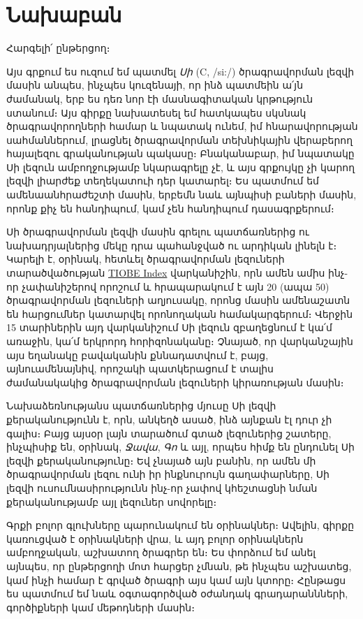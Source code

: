 \chapter*{Նախաբան}

Հարգելի՛ ընթերցող։

Այս գրքում ես ուզում եմ պատմել \emph{Սի} (C, /si:/) ծրագրավորման լեզվի մասին անպես, ինչպես կուզենայի, որ ինձ պատմեին ա՛յն ժամանակ, երբ ես դեռ նոր էի մասնագիտական կրթություն ստանում։ Այս գիրքը նախատեսել եմ հատկապես սկսնակ ծրագրավորողների համար և նպատակ ունեմ, իմ հնարավորության սահմաններում, լրացնել ծրագրավորման տեխնիկային վերաբերող հայալեզու գրականության պակասը։ Բնականաբար, իմ նպատակը Սի լեզուն ամբողջութ\-յամբ նկարագրելը չէ, և այս գրքույկը չի կարող լեզվի լիարժեք տեղեկատուի դեր կատարել։ Ես պատմում եմ ամենաանհրաժեշտի մասին, երբեմն նաև այնպիսի բաների մասին, որոնք քիչ են հանդիպում, կամ չեն հանդիպում դասագրքերում։

Սի ծրագրավորման լեզվի մասին գրելու պատճառներից ու նախադրյալներից մեկը դրա պահանջված ու արդիկան լինելն է։ Կարելի է, օրինակ, հետևել ծրագրավորման լեզուների տարածվածության \href{http://www.tiobe.com/index.php/content/paperinfo/tpci/index.html}{TIOBE Index} վարկանիշին, որն ամեն ամիս ինչ-որ չափանիշերով որոշում և հրապարակում է այն 20 (ապա 50) ծրագրավորման լեզուների աղյուսակը, որոնց մասին ամենաշատն են հարցում\-ներ կատարվել որոնողական համակարգերում։ Վերջին 15 տարիներին այդ վարկանիշում Սի լեզուն զբաղեցնում է կա՛մ առաջին, կա՛մ երկրորդ հորիզոնա\-կանը։ Չնայած, որ վարկանշային այս եղանակը բավականին քննադատվում է, բայց, այնուամենայնիվ, որոշակի պատկերացում է տալիս ժամանակակից ծրագրավորման լեզուների կիրառության մասին։

Նախաձեռնությանս պատճառներից մյուսը Սի լեզվի քերականությունն է, որն, անկեղծ ասած, ինձ այնքան էլ դուր չի գալիս։ Բայց այսօր լայն տարածում գտած լեզուներից շատերը, ինչպիսիք են, օրինակ, \emph{Ջավա}, \emph{Գո} և այլ, որպես հիմք են ընդունել Սի լեզվի քերականությունը։ Եվ չնայած այն բանին, որ ամեն մի ծրագրավորման լեզու ունի իր ինքնուրույն գաղափարները, Սի լեզվի ուսումնասիրությունն ինչ-որ չափով կհեշտացնի նման քերականությամբ այլ լեզուներ սովորելը։


Գրքի բոլոր գլուխները պարունակում են օրինակներ։ Ավելին, գիրքը կառուցված է օրինակների վրա, և այդ բոլոր օրինակներն ամբողջական, աշխատող ծրագրեր են։ Ես փորձում եմ անել այնպես, որ ընթերցողի մոտ հարցեր չմնան, թե ինչպես աշխատեց, կամ ինչի համար է գրված ծրագրի այս կամ այն կտորը։ Հընթացս ես պատմում եմ նաև օգտագործված օժանդակ գրադարաննների, գործիքների կամ մեթոդների մասին։
